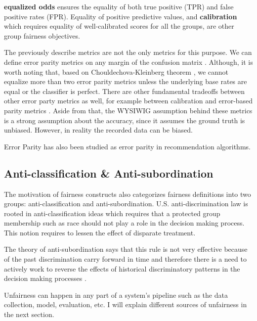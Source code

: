         \textbf{equalized odds} \cite{hardt2016equality} ensures the equality of both true positive (TPR) and false positive rates (FPR). Equality of positive predictive values, and \textbf{calibration} \cite{Kleinberg:InherentTrade} which requires equality of well-calibrated scores for all the groups, are other group fairness objectives. 
        
        The previously describe metrics are not the only metrics for this purpose. We can define error parity metrics on any margin of the confusion matrix \cite{mitchell2021algorithmic}. Although, it is worth noting that, based on Chouldechova-Kleinberg theorem \cite{chouldechova2017fair,Kleinberg:InherentTrade}, we cannot equalize more than two error parity metrics unless the underlying base rates are equal or the classifier is perfect. There are other fundamental tradeoffs between other error party metrics as well, for example between calibration and error-based parity metrics \cite{pleiss2017fairness}. Aside from that, the WYSIWIG assumption behind these metrics is a strong assumption about the accuracy, since it assumes the ground truth is unbiased. However, in reality the recorded data can be biased.
        
        Error Parity has also been studied as error parity in recommendation algorithms\cite{ekstrand2018all,yao_huang_fatml-2017}.

    
    \subsection{Anti-classification \& Anti-subordination}
        
        The motivation of fairness constructs also categorizes fairness definitions into two groups: anti-classification and anti-subordination. U.S. anti-discrimination law is rooted in anti-classification ideas which requires that a protected group membership such as race should not play a role in the decision making process. This notion requires to lessen the effect of disparate treatment.
        
        The theory of anti-subordination says that this rule is not very effective because of the past discrimination carry forward in time and therefore there is a need to actively work to reverse the effects of historical discriminatory patterns in the decision making processes \cite{barocas2016big}.
    
    Unfairness can happen in any part of a system's pipeline such as the data collection, model, evaluation, etc. I will explain different sources of unfairness in the next section.

